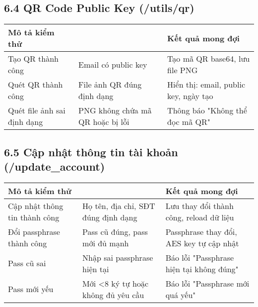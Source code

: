 \subsection*{6.4 QR Code Public Key (/utils/qr)}
\begin{table}[H]
\centering
\begin{tabular}{|>{\centering\arraybackslash}p{4.3cm}|>{\arraybackslash}p{5cm}|>{\centering\arraybackslash}p{7.5cm}|}
\hline
\textbf{Mô tả kiểm thử} &
\multicolumn{1}{>{\centering\arraybackslash}p{5cm}|}{\textbf{Input}} & 
\textbf{Kết quả mong đợi} \\ \hline
Tạo QR thành công & Email có public key & Tạo mã QR base64, lưu file PNG \\ \hline
Quét QR thành công & File ảnh QR đúng định dạng & Hiển thị: email, public key, ngày tạo \\ \hline
Quét file ảnh sai định dạng & PNG không chứa mã QR hoặc bị lỗi & Thông báo "Không thể đọc mã QR" \\ \hline
\end{tabular}
\end{table}

\subsection*{6.5 Cập nhật thông tin tài khoản (/update\_account)}
\begin{table}[H]
\centering
\begin{tabular}{|>{\centering\arraybackslash}p{4.3cm}|>{\arraybackslash}p{5cm}|>{\centering\arraybackslash}p{7.5cm}|}
\hline
\textbf{Mô tả kiểm thử} &
\multicolumn{1}{>{\centering\arraybackslash}p{5cm}|}{\textbf{Input}} & 
\textbf{Kết quả mong đợi} \\ \hline
Cập nhật thông tin thành công & Họ tên, địa chỉ, SĐT đúng định dạng & Lưu thay đổi thành công, reload dữ liệu \\ \hline
Đổi passphrase thành công & Pass cũ đúng, pass mới đủ mạnh & Passphrase thay đổi, AES key tự cập nhật \\ \hline
Pass cũ sai & Nhập sai passphrase hiện tại & Báo lỗi "Passphrase hiện tại không đúng" \\ \hline
Pass mới yếu & Mới <8 ký tự hoặc không đủ yêu cầu & Báo lỗi "Passphrase mới quá yếu" \\ \hline
\end{tabular}
\end{table}

